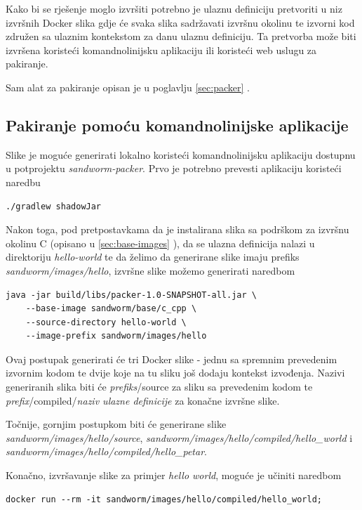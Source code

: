 \documentclass[times, utf8, zavrsni]{fer}
\begin{document}
{{{\begin{appendices}
Kako bi se rješenje moglo izvršiti potrebno je ulaznu definiciju pretvoriti u niz izvršnih Docker slika gdje će svaka slika sadržavati izvršnu okolinu te izvorni kod združen sa ulaznim kontekstom za danu ulaznu definiciju. Ta pretvorba može biti izvršena koristeći komandnolinijsku aplikaciju ili koristeći web uslugu za pakiranje.

Sam alat za pakiranje opisan je u poglavlju \ref{sec:packer} .

\subsection{Pakiranje pomoću komandnolinijske aplikacije}

Slike je moguće generirati lokalno koristeći komandnolinijsku aplikaciju dostupnu u potprojektu {\textit{sandworm-packer}}. Prvo je potrebno prevesti aplikaciju koristeći naredbu

\begin{lstlisting}
./gradlew shadowJar
\end{lstlisting}

Nakon toga, pod pretpostavkama da je instalirana slika sa podrškom za izvršnu okolinu C (opisano u \ref{sec:base-images} ), da se ulazna definicija nalazi u direktoriju {\textit{hello-world}} te da želimo da generirane slike imaju prefiks {\textit{sandworm/images/hello}}, izvršne slike možemo generirati naredbom

\begin{lstlisting}
java -jar build/libs/packer-1.0-SNAPSHOT-all.jar \
	--base-image sandworm/base/c_cpp \
	--source-directory hello-world \
	--image-prefix sandworm/images/hello
\end{lstlisting}

Ovaj postupak generirati će tri Docker slike - jednu sa spremnim prevedenim izvornim kodom te dvije koje na tu sliku još dodaju kontekst izvođenja. Nazivi generiranih slika biti će {\textit{prefiks}}/source za sliku sa prevedenim kodom te {\textit{prefix}}/compiled/{\textit{naziv ulazne definicije}} za konačne izvršne slike.

Točnije, gornjim postupkom biti će generirane slike {\textit{sandworm/images/hello/source}}, {\textit{sandworm/images/hello/compiled/hello\_world}} i {\textit{sandworm/images/hello/compiled/hello\_petar}}.

Konačno, izvršavanje slike za primjer {\textit{hello world}}, moguće je učiniti naredbom

\begin{lstlisting}
docker run --rm -it sandworm/images/hello/compiled/hello_world;
\end{lstlisting}


\end{appendices}}}}
\end{document}
